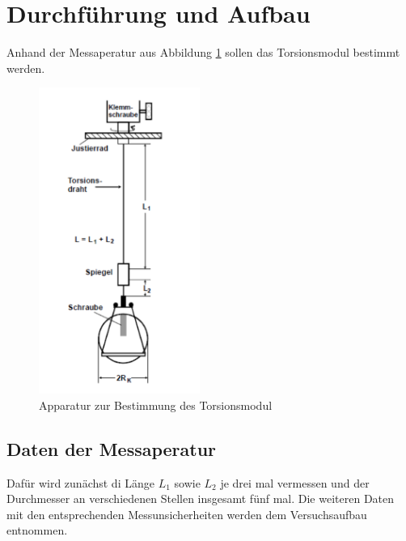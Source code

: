 \section{Durchführung und Aufbau}
\label{sec:Durchführung}
Anhand der Messaperatur aus Abbildung \ref{fig:Mess} sollen das Torsionsmodul bestimmt werden.
\begin{figure}
  \centering
  \includegraphics[height=10cm]{picture/Messapperatur.png}
  \caption{Apparatur zur Bestimmung des Torsionsmodul}
  \label{fig:Mess}
\end{figure}
\subsection{Daten der Messaperatur}
Dafür wird zunächst di Länge $L_1$ sowie $L_2$ je drei mal vermessen und der Durchmesser an verschiedenen Stellen insgesamt fünf mal. Die weiteren Daten mit den entsprechenden Messunsicherheiten werden dem Versuchsaufbau entnommen.
